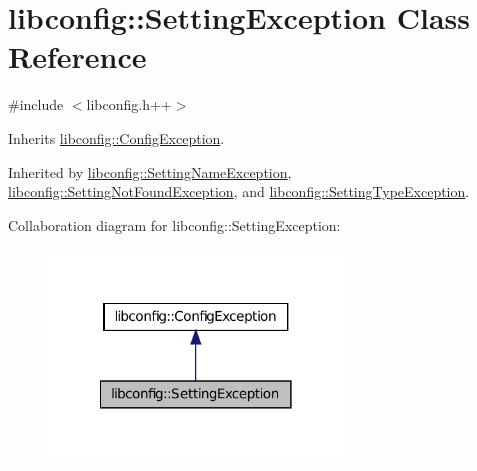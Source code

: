 \hypertarget{classlibconfig_1_1_setting_exception}{
\section{libconfig::SettingException Class Reference}
\label{classlibconfig_1_1_setting_exception}
}


{\ttfamily \#include $<$libconfig.h++$>$}



Inherits \hyperlink{classlibconfig_1_1_config_exception}{libconfig::ConfigException}.



Inherited by \hyperlink{classlibconfig_1_1_setting_name_exception}{libconfig::SettingNameException}, \hyperlink{classlibconfig_1_1_setting_not_found_exception}{libconfig::SettingNotFoundException}, and \hyperlink{classlibconfig_1_1_setting_type_exception}{libconfig::SettingTypeException}.



Collaboration diagram for libconfig::SettingException:
\nopagebreak
\begin{figure}[H]
\begin{center}
\leavevmode
\includegraphics[width=222pt]{classlibconfig_1_1_setting_exception__coll__graph}
\end{center}
\end{figure}
